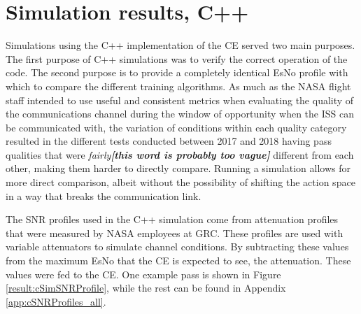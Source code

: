\section{Simulation results, C++}
\par Simulations using the C++ implementation of the CE served two main purposes. The first purpose of C++ simulations was to verify the correct operation of the code. The second purpose is to provide a completely identical EsNo profile with which to compare the different training algorithms. As much as the NASA flight staff intended to use useful and consistent metrics when evaluating the quality of the communications channel during the window of opportunity when the ISS can be communicated with, the variation of conditions within each quality category resulted in the different tests conducted between 2017 and 2018 having pass qualities that were \textit{fairly\textbf{[this word is probably too vague]}} different from each other, making them harder to directly compare. Running a simulation allows for more direct comparison, albeit without the possibility of shifting the action space in a way that breaks the communication link.
\par The SNR profiles used in the C++ simulation come from attenuation profiles that were measured by NASA employees at GRC. These profiles are used with variable attenuators to simulate channel conditions. By subtracting these values from the maximum EsNo that the CE is expected to see, the attenuation. These values were fed to the CE. One example pass is shown in Figure \ref{result:cSimSNRProfile}, while the rest can be found in Appendix \ref{app:cSNRProfiles_all}. 

